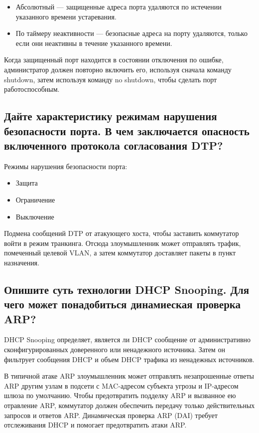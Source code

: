 \begin{itemize}
	\item Абсолютный --- защищенные адреса порта удаляются по истечении 
		указанного времени устаревания.
	\item По таймеру неактивности --- безопасные адреса на порту 
		удаляются, только если они неактивны в течение указанного 
		времени.
\end{itemize}

Когда защищенный порт находится в состоянии отключения по 
ошибке, администратор должен повторно включить его, используя сначала 
команду shutdown, затем используя команду no shutdown, чтобы сделать 
порт работоспособным.

\subsection{Дайте характеристику режимам нарушения безопасности порта. 
В чем заключается опасность включенного протокола 
согласования DTP?}

Режимы нарушения безопасности порта:
 
\begin{itemize}
	\item Защита
	\item Ограничение
	\item Выключение
\end{itemize}

Подмена сообщений DTP от атакующего хоста, чтобы заставить 
коммутатор войти в режим транкинга. Отсюда злоумышленник может 
отправлять трафик, помеченный целевой VLAN, а затем коммутатор 
доставляет пакеты в пункт назначения.

\subsection{Опишите суть технологии DHCP Snooping. Для чего может 
понадобиться динамиеская проверка ARP?}

DHCP Snooping определяет, является ли DHCP сообщение от 
административно сконфигурированных доверенного или ненадежного 
источника. Затем он фильтрует сообщения DHCP и объем DHCP трафика из 
ненадежных источников.\par
В типичной атаке ARP злоумышленник может отправлять 
незапрошенные ответы ARP другим узлам в подсети с MAC-адресом 
субъекта угрозы и IP-адресом шлюза по умолчанию. Чтобы предотвратить 
подделку ARP и вызванное ею отравление ARP, коммутатор должен 
обеспечить передачу только действительных запросов и ответов ARP. 
Динамическая проверка ARP (DAI) требует отслеживания DHCP и 
помогает предотвратить атаки ARP.

